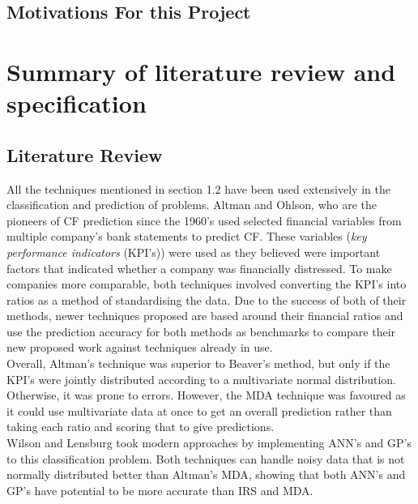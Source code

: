 \documentclass[11pt]{article}
\begin{document}
\subsection{Motivations For this Project}
\newpage
\section{Summary of literature review and specification}\label{sec:spec}
\subsection{Literature Review}
All the techniques mentioned in section 1.2 have been used extensively in the classification and prediction of problems. Altman and Ohlson, who are the pioneers of CF prediction since the 1960's used selected financial variables from multiple company's bank statements to predict CF. These variables (\textit{key performance indicators} (KPI's)) were used as they believed were important factors that indicated whether a company was financially distressed. To make companies more comparable, both techniques involved converting the KPI's into ratios as a method of standardising the data. Due to the success of both of their methods, newer techniques proposed are based around their financial ratios and use the prediction accuracy for both methods as benchmarks to compare their new proposed work against techniques already in use. \\

Overall, Altman's technique was superior to Beaver's method, but only if the KPI's were jointly distributed according to a multivariate normal distribution. Otherwise, it was prone to errors. However, the MDA technique was favoured as it could use multivariate data at once to get an overall prediction rather than taking each ratio and scoring that to give predictions. \\
Wilson and Lensburg took modern approaches by implementing ANN's and GP's to this classification problem. Both techniques can handle noisy data that is not normally distributed better than Altman's MDA, showing that both ANN's and GP's have potential to be more accurate than IRS and MDA. 
\end{document}
